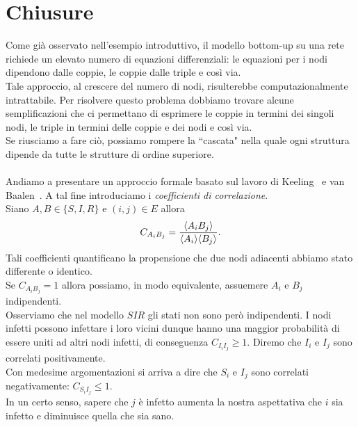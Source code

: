 \section{Chiusure}
Come gi\`a osservato nell'esempio introduttivo, il modello bottom-up su una rete richiede un elevato numero di equazioni differenziali: le equazioni per i nodi dipendono dalle coppie, le coppie dalle triple e cos\`i via.\\
Tale approccio, al crescere del numero di nodi, risulterebbe computazionalmente intrattabile. Per risolvere questo problema dobbiamo trovare alcune semplificazioni che ci permettano di esprimere le coppie in termini dei singoli nodi, le triple in termini delle coppie e dei nodi e cos\`i via.\\
Se riusciamo a fare ci\`o, possiamo rompere la ``cascata" nella quale ogni struttura dipende da tutte le strutture di ordine superiore.\\ \\
Andiamo a presentare un approccio formale basato sul lavoro di Keeling~\cite{keeling1995ecology}  e van Baalen~\cite{van2000pair}.  A tal fine introduciamo i  \textit{coefficienti di correlazione}.\\
Siano $A, B\in \{ S, I,R\}$ e $(i,j)\in E$ allora 
$$C_{A_i B_j} = \frac{\langle A_i B_j \rangle}{\langle A_i \rangle \langle B_j \rangle}.$$
Tali coefficienti quantificano la propensione che due nodi adiacenti abbiamo stato differente o identico.\\
Se $C_{A_iB_j}=1$ allora possiamo, in modo equivalente, assuemere  $A_i$ e $B_j$ indipendenti.\\
Osserviamo che nel modello $SIR$ gli stati non sono per\`o indipendenti. I nodi infetti possono infettare i loro vicini dunque hanno una maggior probabilit\`a di essere uniti ad altri nodi infetti,  di conseguenza  $C_{I_i I_j}\geq 1$.  Diremo che $I_i$ e $I_j$ sono correlati positivamente.\\
Con medesime argomentazioni si arriva a dire che $S_i$ e $I_j$ sono correlati negativamente: $C_{S_i I_j}\leq 1$.\\
 In un certo senso, sapere che $j$ \`e infetto aumenta la nostra aspettativa  che $i$ sia infetto e diminuisce quella che sia sano.\\
  
